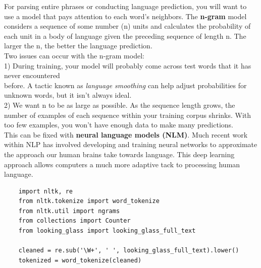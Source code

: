 \documentclass[11pt, a4paper]{article}
\begin{document}
\begin{spacing}{1.1}
	\noindent For parsing entire phrases or conducting language prediction, you will want to use a model that pays attention to each word’s neighbors. The \textbf{n-gram} model considers a sequence of some number (n) units and calculates the probability of each unit in a body of language given the preceding sequence of length n. The larger the n, the better the language prediction. \vspace*{1.5mm} \\
	Two issues can occur with the n-gram model: \\
	1) During training, your model will probably come across test words that it has never encountered \\ \hspace*{3mm} before. A tactic known as \textit{language smoothing} can help adjust probabilities for unknown words, but \hspace*{3mm} it isn’t always ideal. \\
	2) We want n to be as large as possible. As the sequence length grows, the number of examples of each \hspace*{3mm} sequence within your training corpus shrinks. With too few examples, you won’t have enough data to \hspace*{3mm} make many predictions. \vspace*{2mm} \\
	This can be fixed with \textbf{neural language models (NLM)}. Much recent work within NLP has involved developing and training neural networks to approximate the approach our human brains take towards language. This deep learning approach allows computers a much more adaptive tack to processing human language.
	\begin{lstlisting}
	import nltk, re
	from nltk.tokenize import word_tokenize
	from nltk.util import ngrams
	from collections import Counter
	from looking_glass import looking_glass_full_text
	
	cleaned = re.sub('\W+', ' ', looking_glass_full_text).lower()
	tokenized = word_tokenize(cleaned)
	

\end{lstlisting}
\end{spacing}
\end{document}

